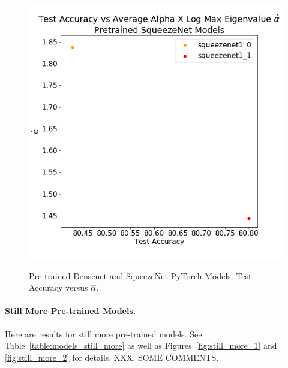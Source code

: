 \begin{figure}[!htb]
{       \includegraphics[scale=0.30]{img/squeezenet-pytorch-w_alphas.png} 
       \label{fig:squeezenet}
   }
   \caption{
      Pre-trained 
      Densenet and SqueezeNet PyTorch 
      Models.
      Test Accuracy versus
      $\hat{\alpha}$.
           }
   \label{fig:models_more}
\end{figure}


\paragraph{Still More Pre-trained Models.}

Here are results for still more pre-trained models.
See
Table~\ref{table:models_still_more}
as well as
Figures~\ref{fig:still_more_1} and \ref{fig:still_more_2}
for details.
XXX.  SOME COMMENTS.


